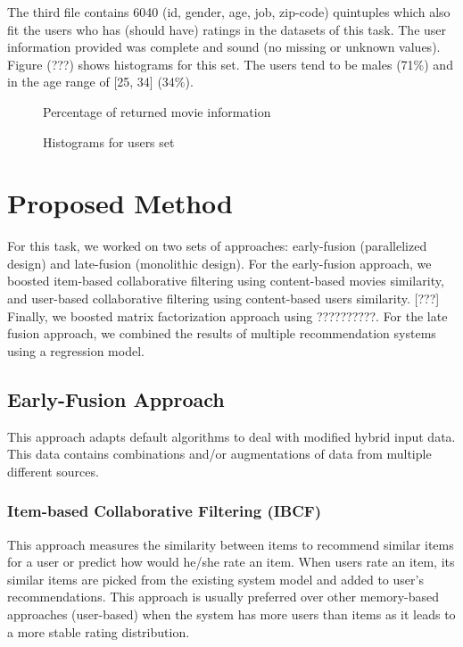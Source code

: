 \documentclass{sigish}
\begin{document}
The third file contains 6040 (id, gender, age, job, zip-code) quintuples which also fit the users who has (should have) ratings in the datasets of this task. The user information provided was complete and sound (no missing or unknown values). Figure (???) shows histograms for this set. The users tend to be males (71\%) and in the age range of [25, 34] (34\%).

\begin{figure}
\centering
\caption{Percentage of returned movie information}
\label{fig:sources}
\end{figure}

\begin{figure}
\centering
\caption{Histograms for users set}
\label{fig:density}
\end{figure}

\section{Proposed Method}

For this task, we worked on two sets of approaches: early-fusion (parallelized design) and late-fusion (monolithic design). For the early-fusion approach, we boosted item-based collaborative filtering using content-based movies similarity, and user-based collaborative filtering using content-based users similarity. [???] Finally, we boosted matrix factorization approach using ??????????.
For the late fusion approach, we combined the results of multiple recommendation systems using a regression model.

\subsection{Early-Fusion Approach}

This approach adapts default algorithms to deal with modified hybrid input data. This data contains combinations and/or augmentations of data from multiple different sources.

\subsubsection{Item-based Collaborative Filtering (IBCF)}

This approach measures the similarity between items to recommend similar items for a user or predict how would he/she rate an item. When users rate an item, its similar items are picked from the existing system model and added to user's recommendations. This approach is usually preferred over other memory-based approaches (user-based) when the system has more users than items as it leads to a more stable rating distribution.
\end{document}
